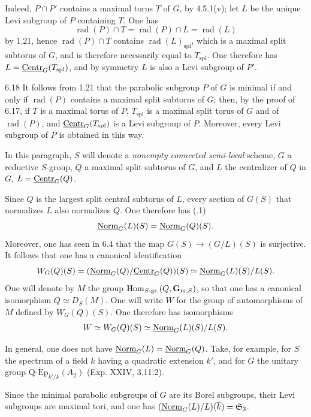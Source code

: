 Indeed, $P\cap P'$ contains a maximal torus $T$ of $G$, by 4.5.1(v); let $L$ be the unique Levi subgroup of $P$ containing $T$. One has
\[
 \operatorname{rad}(P)\cap T=\operatorname{rad}(P)\cap L=\operatorname{rad}(L)
\]
by 1.21, hence $\operatorname{rad}(P)\cap T$ contains $\operatorname{rad}(L)_{\mathrm{spl}}$, which is a maximal split subtorus of $G$, and is therefore necessarily equal to $T_{\mathrm{spl}}$. One therefore has $L=\underline{\mathrm{Centr}}_G(T_{\mathrm{spl}})$, and by symmetry $L$ is also a Levi subgroup of $P'$.

\begin{remark}{6.18}\label{XXVI.6.18}
It follows from 1.21 that the parabolic subgroup $P$ of $G$ is minimal if and only if $\operatorname{rad}(P)$ contains a maximal split subtorus of $G$; then, by the proof of 6.17, if $T$ is a maximal torus of $P$, $T_{\mathrm{spl}}$ is a maximal split torus of $G$ and of $\operatorname{rad}(P)$, and $\underline{\mathrm{Centr}}_G(T_{\mathrm{spl}})$ is a Levi subgroup of $P$. Moreover, every Levi subgroup of $P$ is obtained in this way.
\end{remark}

In this paragraph, $S$ will denote a \emph{nonempty connected semi-local} scheme, $G$ a reductive $S$-group, $Q$ a maximal split subtorus of $G$, and $L$ the centralizer of $Q$ in $G$, \ie $L=\underline{\mathrm{Centr}}_G(Q)$.

\label{XXVI.7.1}
Since $Q$ is the largest split central subtorus of $L$, every section of $G(S)$ that normalizes $L$ also normalizes $Q$. One therefore has (.1)
\[
 \underline{\mathrm{Norm}}_G(L)(S)=\underline{\mathrm{Norm}}_G(Q)(S).
\]
Moreover, one has seen in 6.4 that the map $G(S)\to(G/L)(S)$ is surjective. It follows that one has a canonical identification
\[
 W_G(Q)(S)=(\underline{\mathrm{Norm}}_G(Q)/\underline{\mathrm{Centr}}_G(Q))(S)\simeq\underline{\mathrm{Norm}}_G(L)(S)/L(S).
\]
One will denote by $M$ the group $\operatorname{Hom}_{S\text{-gr.}}(Q,\mathbf G_{\mathrm m,S})$, so that one has a canonical isomorphism $Q\simeq D_S(M)$. One will write $W$ for the group of automorphisms of $M$ defined by $W_G(Q)(S)$. One therefore has isomorphisms
\[
 W\simeq W_G(Q)(S)\simeq\underline{\mathrm{Norm}}_G(L)(S)/L(S).
\]

\label{XXVI.7.1.1}
In general, one does not have $\underline{\mathrm{Norm}}_G(L)=\underline{\mathrm{Norm}}_G(Q)$. Take, for example, for $S$ the spectrum of a field $k$ having a quadratic extension $k'$, and for $G$ the unitary group $\operatorname{Q\text{-}\acute Ep}_{k'/k}(A_2)$ (\cf Exp. XXIV, 3.11.2).

Since the minimal parabolic subgroups of $G$ are its Borel subgroups, their Levi subgroups are maximal tori, and one has $(\underline{\mathrm{Norm}}_G(L)/L)(\overline k)=\mathfrak S_3$.

